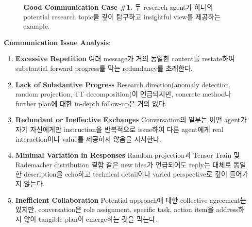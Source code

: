 \begin{figure}[htbp]
\begin{tcolorbox}[
    title=\textbf{Good Communication Case \#1},
    colback=red!1!white,
    colframe=red!50!black,
    fonttitle=\bfseries
]
\end{tcolorbox}
\caption{\textbf{Good Communication Case \#1.} 두 research agent가 하나의 potential research topic을 깊이 탐구하고 insightful view를 제공하는 example.}
\label{fig:bad_comm_case_1}
\end{figure}
\textbf{Communication Issue Analysis}:

\begin{enumerate}
    \item \textbf{Excessive Repetition}
    여러 message가 거의 동일한 content를 restate하여 substantial forward progress를 막는 redundancy를 초래한다.

    \item \textbf{Lack of Substantive Progress}
    Research direction(anomaly detection, random projection, TT decomposition)이 언급되지만, concrete method나 further plan에 대한 in-depth follow-up은 거의 없다.

    \item \textbf{Redundant or Ineffective Exchanges}
    Conversation의 일부는 어떤 agent가 자기 자신에게만 instruction을 반복적으로 issue하여 다른 agent에게 real interaction이나 value를 제공하지 않음을 시사한다.

    \item \textbf{Minimal Variation in Responses}
    Random projection과 Tensor Train 및 Rademacher distribution 결합 같은 new idea가 언급되어도 reply는 대체로 동일한 description을 echo하고 technical detail이나 varied perspective로 깊이 들어가지 않는다.

    \item \textbf{Inefficient Collaboration}
    Potential approach에 대한 collective agreement는 있지만, conversation은 role assignment, specific task, action item을 address하지 않아 tangible plan이 emerge하는 것을 막는다.
\end{enumerate}



